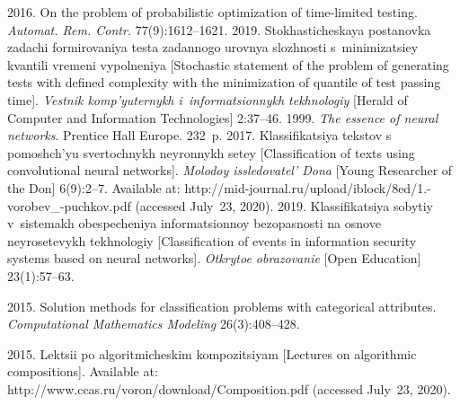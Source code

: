 \begin{multicols}{2}
{{\begin{thebibliography}{99}
 2016. On the problem of probabilistic 
optimization of time-limited testing. \textit{Automat. Rem. Contr.} 77(9):1612--1621.
 2019. Stokhasticheskaya 
postanovka zadachi formirovaniya testa zadannogo urovnya slozhnosti 
s~mi\-ni\-mi\-za\-tsi\-ey kvantili 
vremeni vypolneniya [Stochastic statement of the problem of generating tests
with defined complexity with the minimization of quantile of 
test passing time]. \textit{Vestnik komp'yuternykh 
i~informatsionnykh tekhnologiy} [Herald of Computer and Information Technologies] 2:37--46.
 1999. \textit{The essence of neural networks}. Prentice Hall Europe. 232~p.
 2017. Klassifikatsiya tekstov s pomoshch'yu 
svertochnykh neyronnykh setey [Classification of texts using convolutional neural networks]. 
\textit{Molodoy issledovatel' Dona} [Young Researcher of the Don] 
6(9):2--7. Available at: {\sf 
http://mid-journal.ru/upload/iblock/8ed/1.-vorobev\_-puchkov.pdf} (accessed July~23, 2020).
 2019. Klassifikatsiya sobytiy 
v~sistemakh obespecheniya informatsionnoy bezopasnosti na osnove neyrosetevykh tekhnologiy 
[Classification of events in information security systems based on neural networks]. 
\textit{Otkrytoe obrazovanie} [Open Education] 23(1):57--63.

 2015. Solution methods for classification problems with categorical 
attributes. \textit{Computational Mathematics Modeling} 26(3):408--428.

 2015. Lektsii po algoritmicheskim kompozitsiyam [Lectures on 
algorithmic compositions]. Available at: {\sf  
http://www.ccas.ru/voron/download/\linebreak Composition.pdf} (accessed July~23, 2020).


\end{thebibliography}}}
\end{multicols}

